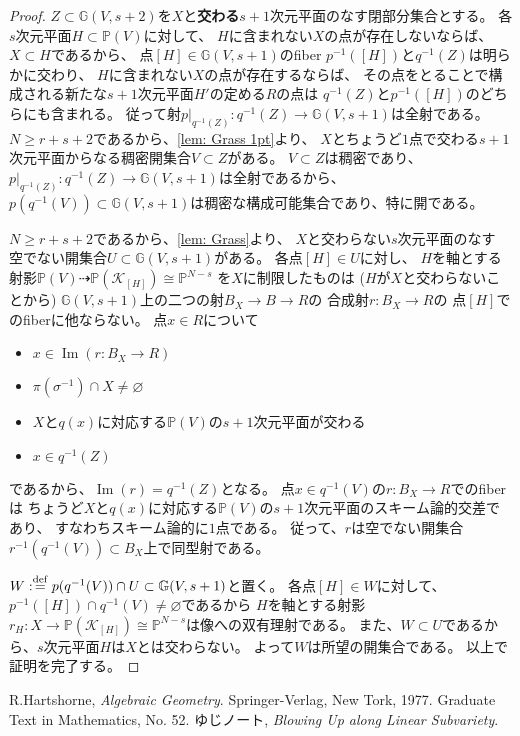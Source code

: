 \documentclass[uplatex]{jsarticle}
\theoremstyle{definition}
\DeclareMathOperator{\im}{\mathrm{Im}}
\newcommand{\G}{\mathbb{G}}
\renewcommand{\P}{\mathbb{P}}
\newcommand{\mcK}{\mathcal{K}}
\newcommand{\dto}{\dashrightarrow}
\renewcommand{\emptyset}{\varnothing}
\newcommand{\dfn}{:\overset{\mathrm{\scriptsize def}}{=}}
\begin{document}
\begin{proof}
  \(Z\subset \G(V,s+2)\)を\(X\)と\textbf{交わる}\(s+1\)次元平面のなす閉部分集合とする。
  各\(s\)次元平面\(H\subset \P(V)\)に対して、
  \(H\)に含まれない\(X\)の点が存在しないならば、\(X\subset H\)であるから、
  点\([H]\in \G(V,s+1)\)のfiber \(p^{-1}([H])\)と\(q^{-1}(Z)\)は明らかに交わり、
  \(H\)に含まれない\(X\)の点が存在するならば、
  その点をとることで構成される新たな\(s+1\)次元平面\(H'\)の定める\(R\)の点は
  \(q^{-1}(Z)\)と\(p^{-1}([H])\)のどちらにも含まれる。
  従って射\(p|_{q^{-1}(Z)}:q^{-1}(Z)\to \G(V,s+1)\)は全射である。
  \(N \geq r+s+2\)であるから、\autoref{lem: Grass 1pt}より、
  \(X\)とちょうど\(1\)点で交わる\(s+1\)次元平面からなる稠密開集合\(V\subset Z\)がある。
  \(V\subset Z\)は稠密であり、
  \(p|_{q^{-1}(Z)}:q^{-1}(Z)\to \G(V,s+1)\)は全射であるから、
  \(p(q^{-1}(V))\subset \G(V,s+1)\)は稠密な構成可能集合であり、特に開である。

  \(N \geq r+s+2\)であるから、\autoref{lem: Grass}より、
  \(X\)と交わらない\(s\)次元平面のなす
  空でない開集合\(U\subset \G(V,s+1)\)がある。
  各点\([H]\in U\)に対し、
  \(H\)を軸とする射影\(\P(V)\dto \P(\mcK_{[H]})\cong \P^{N-s}\)
  を\(X\)に制限したものは
  (\(H\)が\(X\)と交わらないことから)
  \(\G(V,s+1)\)上の二つの射\(B_X\to B\to R\)の
  合成射\(r:B_X\to R\)の
  点\([H]\)でのfiberに他ならない。
  点\(x\in R\)について
  \begin{itemize}
    \item[ \ ] \(x\in \im (r:B_X\to R)\)
    \item[\(\iff\)] \(\pi(\sigma^{-1})\cap X \neq \emptyset\)
    \item[\(\iff\)] \(X\)と\(q(x)\)に対応する\(\P(V)\)の\(s+1\)次元平面が交わる
    \item[\(\iff\)] \(x\in q^{-1}(Z)\)
  \end{itemize}
  であるから、\(\im (r) = q^{-1}(Z)\)となる。
  点\(x\in q^{-1}(V)\)の\(r:B_X\to R\)でのfiberは
  ちょうど\(X\)と\(q(x)\)に対応する\(\P(V)\)の\(s+1\)次元平面のスキーム論的交差であり、
  すなわちスキーム論的に\(1\)点である。
  従って、\(r\)は空でない開集合\(r^{-1}(q^{-1}(V))\subset B_X\)上で同型射である。

  \(W\dfn p(q^{-1}(V))\cap U\subset \G(V,s+1)\)と置く。
  各点\([H]\in W\)に対して、
  \(p^{-1}([H])\cap q^{-1}(V)\neq \emptyset\)であるから
  \(H\)を軸とする射影\(r_H:X\to \P(\mcK_{[H]})\cong \P^{N-s}\)は像への双有理射である。
  また、\(W\subset U\)であるから、\(s\)次元平面\(H\)は\(X\)とは交わらない。
  よって\(W\)は所望の開集合である。
  以上で証明を完了する。
\end{proof}








\begin{thebibliography}{9}
  R.Hartshorne,
  \textit{Algebraic Geometry}.
  Springer-Verlag, New Tork, 1977. Graduate Text in Mathematics, No. 52.
  ゆじノート,
  \textit{Blowing Up along Linear Subvariety}.
\end{thebibliography}
\end{document}
